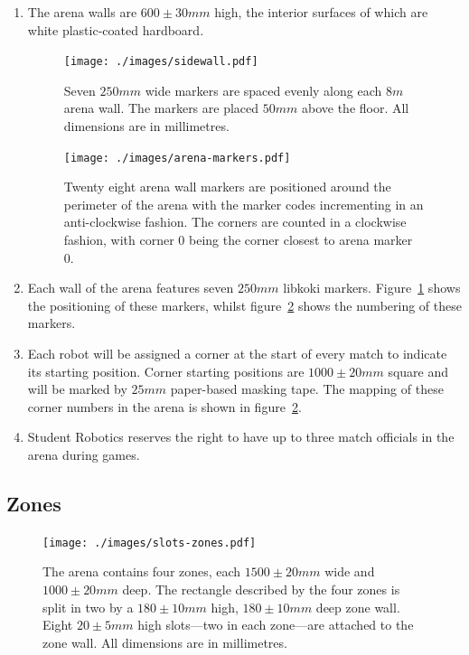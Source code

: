 \begin{enumerate}
\item The arena walls are $600\pm30mm$ high, the interior surfaces of which are white plastic-coated hardboard.

\begin{figure}
  \centering
  \texttt{[image: ./images/sidewall.pdf]}
  \caption{Seven $250mm$ wide markers are spaced evenly along each $8m$ arena wall.
           The markers are placed $50mm$ above the floor.
	   All dimensions are in millimetres.}
  \label{fig:arena-wall}
\end{figure}

\begin{figure}
  \centering
  \texttt{[image: ./images/arena-markers.pdf]}
  \caption{Twenty eight arena wall markers are positioned around the perimeter of the arena with the marker codes incrementing in an anti-clockwise fashion.
           The corners are counted in a clockwise fashion, with corner 0 being the corner closest to arena marker 0.}
  \label{fig:arena-zones}
\end{figure}

\item Each wall of the arena features seven $250mm$ libkoki markers.
      Figure~\ref{fig:arena-wall} shows the positioning of these markers, whilst figure~\ref{fig:arena-zones} shows the numbering of these markers.

\item Each robot will be assigned a corner at the start of every match to indicate its starting position.
      Corner starting positions are $1000 \pm 20mm$ square and will be marked by $25mm$ paper-based masking tape.
      The mapping of these corner numbers in the arena is shown in figure~\ref{fig:arena-zones}.

\item Student Robotics reserves the right to have up to three match officials in the arena during games.

\end{enumerate}


\subsection{Zones}
\label{sub:Zones}

\begin{figure}
  \centering
  \texttt{[image: ./images/slots-zones.pdf]}
  \caption{The arena contains four zones, each $1500 \pm 20mm$ wide and $1000 \pm 20mm$ deep.
           The rectangle described by the four zones is split in two by a $180 \pm 10mm$ high, $180 \pm 10mm$ deep zone wall.
           Eight $20 \pm 5mm$ high slots---two in each zone---are attached to the zone wall.
           All dimensions are in millimetres.}
  \label{fig:slots-zones}
\end{figure}

